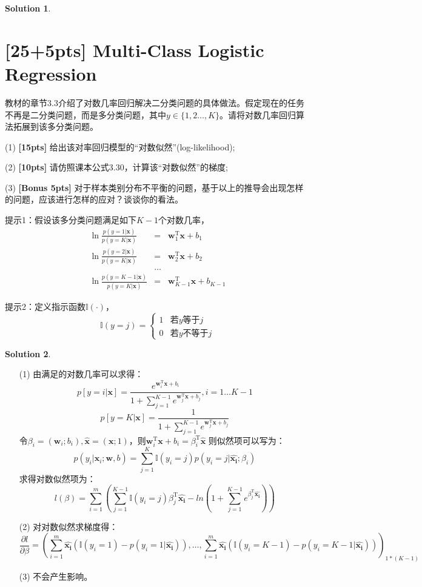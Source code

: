 \documentclass[a4paper,UTF8]{article}
\theoremstyle{definition}
\newtheorem*{solution}{Solution}
\begin{document}
\begin{solution}
\end{solution}

\section{[25+5pts] Multi-Class Logistic Regression}
教材的章节3.3介绍了对数几率回归解决二分类问题的具体做法。假定现在的任务不再是二分类问题，而是多分类问题，其中$y\in\{1,2\dots,K\}$。请将对数几率回归算法拓展到该多分类问题。


(1) \textbf{[15pts]} 给出该对率回归模型的“对数似然”(log-likelihood);

(2) \textbf{[10pts]} 请仿照课本公式3.30，计算该“对数似然”的梯度;

(3) \textbf{[Bonus 5pts]} 对于样本类别分布不平衡的问题，基于以上的推导会出现怎样的问题，应该进行怎样的应对？谈谈你的看法。


提示1：假设该多分类问题满足如下$K-1$个对数几率，
\begin{eqnarray*}
	\ln\frac{p(y=1|\mathbf{x})}{p(y=K|\mathbf{x})}&=&\mathbf{w}_1^\mathrm{T}\mathbf{x}+b_1\\
	\ln\frac{p(y=2|\mathbf{x})}{p(y=K|\mathbf{x})}&=&\mathbf{w}_2^\mathrm{T}\mathbf{x}+b_2\\
	&\dots&\\
	\ln\frac{p(y={K-1}|\mathbf{x})}{p(y=K|\mathbf{x})}&=&\mathbf{w}_{K-1}^\mathrm{T}\mathbf{x}+b_{K-1}
\end{eqnarray*}

提示2：定义指示函数$\mathbb{I}(\cdot)$，
$$\mathbb{I}(y=j)=
	\begin{cases}
		1 & \text{若$y$等于$j$}   \\
		0 & \text{若$y$不等于$j$}
	\end{cases}$$

\begin{solution}
	\begin{enumerate}
		\item [(1)] 由满足的对数几率可以求得：
		      \[p\left[ y=i |\mathbf{x}\right] = \frac{e^{\mathbf{w}_i^\mathrm{T}\mathbf{x}+b_i}}{1+\sum_{j=1}^{K-1}e^{\mathbf{w}_j^\mathrm{T}\mathbf{x}+b_j}},i=1\ldots K-1\]
		      \[p\left[y=K | \mathbf{x}\right] = \frac{1}{1+\sum_{j=1}^{K-1}e^{\mathbf{w}_j^\mathrm{T}\mathbf{x}+b_j}}\]
		      令$\beta_i = (\mathbf{w}_i;b_i), \hat{\mathbf{x}}=(\mathbf{x};1)$，则$\mathbf{w}_i^\mathrm{T}\mathbf{x}+b_i=\beta_i^\mathrm{T}\hat{\mathbf{x}}$
		      则似然项可以写为：
		      \[p(y_i|\mathbf{x}_i;\mathbf{w},b)=\sum_{j=1}^{K}\mathbb{I}(y_i=j)p(y_i=j|\hat{\mathbf{x_i}};\beta_i)\]
		      求得对数似然项为：
		      \[l(\beta) = \sum_{i=1}^m(\sum_{j=1}^{K-1}\mathbb{I}(y_i=j)\beta_j^\mathrm{T}\hat{\mathbf{x_i}}-ln(1+\sum_{j=1}^{K-1}e^{\beta_j^\mathrm{T}\hat{\mathbf{x_i}}}))\]

		\item [(2)]对对数似然求梯度得：
		      \[\frac{\partial{l}}{\partial{\beta}} = (\sum_{i=1}^m\hat{\mathbf{x_i}}(\mathbb{I}(y_i=1)-p(y_i = 1|\hat{\mathbf{x_i}})), \ldots, \sum_{i=1}^m\hat{\mathbf{x_i}}(\mathbb{I}(y_i=K-1)-p(y_i = K-1|\hat{\mathbf{x_i}})))_{1*(K-1)}\]
		\item [(3)] 不会产生影响。
	\end{enumerate}
\end{solution}
\end{document}

